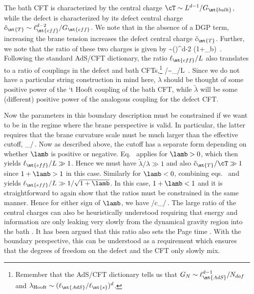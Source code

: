 The bath CFT is characterized by the central charge $\cT\sim L^{d-1}/G_\mt{bulk}$, while the defect is characterized by its defect central charge $\tilde{c}_\mt{T}\sim \ell_\mt{eff}^{d-2}/G_\mt{eff}$. We note that in the absence of a DGP term, increasing the brane tension increases the defect central charge $\tilde c_\mt{T}$. Further, we note that the ratio of these two charges is given by
\beq\label{eq:eq:large_central_charges}
 \sim \left(\right)^{d-2} (1+\lambda_b) \,.
\eeq
Following the standard AdS/CFT dictionary, the ratio $\ell_\mt{eff}/L$ also  translates to a ratio of couplings in the defect and bath CFTs,\footnote{Remember that the AdS/CFT dictionary tells us that $G_N\sim \ell_\mt{AdS}^{d-1}/ N_{dof}$ and $\lambda_\text{Hooft}\sim (\ell_\mt{AdS}/\ell_\mt{s})^{d}$.}
\beq\label{ratou}
{\tilde \lambda}/{\lambda}\sim{\ell_}/{L}  \,.
\eeq
Since we do not have a particular string construction in mind here, $\lambda$ should be thought of some positive power of the `t Hooft coupling of the bath CFT, while $\tilde\lambda$ will be some (different) positive power of the analogous coupling for the defect CFT.

Now the parameters in this boundary description must be constrained if we want to be in the regime where the brane perspective is valid. In particular, the latter requires that the brane curvature scale must be much larger than the effective cutoff, \ie
\beq
\ell_/\tilde\delta {}\,.
\label{ratou3}
\eeq
Now as described above, the cutoff has a separate form depending on whether $\lamb$ is positive or negative. Eq.~ applies for $\lamb>0$, which then yields $\ell_\mt{eff}/L \gg1$. Hence we must have ${\tilde \lambda}/{\lambda}\gg1$ and also $\tilde c_\mt{T}/\cT\gg1$ since $1+\lamb>1$ in this case. Similarly for $\lamb<0$, combining eqs.~ and  yields $\ell_\mt{eff}/L \gg1/\sqrt{1+\lamb}$. In this case, $1+\lamb<1$ and it is straightforward to again show that the ratios must be constrained in the same manner. Hence for either sign of $\lamb$, we have 
\beq
{\tilde \lambda}/{\lambda}\qquad \tilde c_/\cT{}\,.
\label{ratou4}
\eeq
The large ratio of the central charges can also be heuristically understood requiring that energy and information are only leaking very slowly from the dynamical gravity region into the bath \cite{Rozali:2019day}. It has been argued that this ratio also sets the Page time \cite{Rozali:2019day}. With the boundary perspective, this can be understood as a requirement which ensures that the degrees of freedom on the defect and the CFT only slowly mix.

